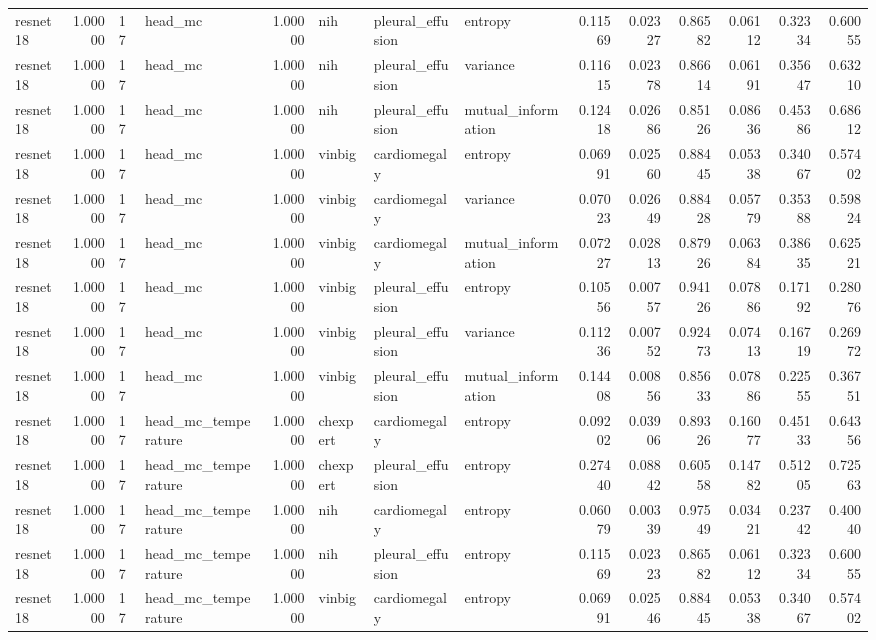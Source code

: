 \begin{tabular}{lrllrlllrrrrrr}
resnet18 & 1.00000 & 17 & head\_mc & 1.00000 & nih & pleural\_effusion & entropy & 0.11569 & 0.02327 & 0.86582 & 0.06112 & 0.32334 & 0.60055 \\
resnet18 & 1.00000 & 17 & head\_mc & 1.00000 & nih & pleural\_effusion & variance & 0.11615 & 0.02378 & 0.86614 & 0.06191 & 0.35647 & 0.63210 \\
resnet18 & 1.00000 & 17 & head\_mc & 1.00000 & nih & pleural\_effusion & mutual\_information & 0.12418 & 0.02686 & 0.85126 & 0.08636 & 0.45386 & 0.68612 \\
resnet18 & 1.00000 & 17 & head\_mc & 1.00000 & vinbig & cardiomegaly & entropy & 0.06991 & 0.02560 & 0.88445 & 0.05338 & 0.34067 & 0.57402 \\
resnet18 & 1.00000 & 17 & head\_mc & 1.00000 & vinbig & cardiomegaly & variance & 0.07023 & 0.02649 & 0.88428 & 0.05779 & 0.35388 & 0.59824 \\
resnet18 & 1.00000 & 17 & head\_mc & 1.00000 & vinbig & cardiomegaly & mutual\_information & 0.07227 & 0.02813 & 0.87926 & 0.06384 & 0.38635 & 0.62521 \\
resnet18 & 1.00000 & 17 & head\_mc & 1.00000 & vinbig & pleural\_effusion & entropy & 0.10556 & 0.00757 & 0.94126 & 0.07886 & 0.17192 & 0.28076 \\
resnet18 & 1.00000 & 17 & head\_mc & 1.00000 & vinbig & pleural\_effusion & variance & 0.11236 & 0.00752 & 0.92473 & 0.07413 & 0.16719 & 0.26972 \\
resnet18 & 1.00000 & 17 & head\_mc & 1.00000 & vinbig & pleural\_effusion & mutual\_information & 0.14408 & 0.00856 & 0.85633 & 0.07886 & 0.22555 & 0.36751 \\
resnet18 & 1.00000 & 17 & head\_mc\_temperature & 1.00000 & chexpert & cardiomegaly & entropy & 0.09202 & 0.03906 & 0.89326 & 0.16077 & 0.45133 & 0.64356 \\
resnet18 & 1.00000 & 17 & head\_mc\_temperature & 1.00000 & chexpert & pleural\_effusion & entropy & 0.27440 & 0.08842 & 0.60558 & 0.14782 & 0.51205 & 0.72563 \\
resnet18 & 1.00000 & 17 & head\_mc\_temperature & 1.00000 & nih & cardiomegaly & entropy & 0.06079 & 0.00339 & 0.97549 & 0.03421 & 0.23742 & 0.40040 \\
resnet18 & 1.00000 & 17 & head\_mc\_temperature & 1.00000 & nih & pleural\_effusion & entropy & 0.11569 & 0.02323 & 0.86582 & 0.06112 & 0.32334 & 0.60055 \\
resnet18 & 1.00000 & 17 & head\_mc\_temperature & 1.00000 & vinbig & cardiomegaly & entropy & 0.06991 & 0.02546 & 0.88445 & 0.05338 & 0.34067 & 0.57402 \\

\end{tabular}
